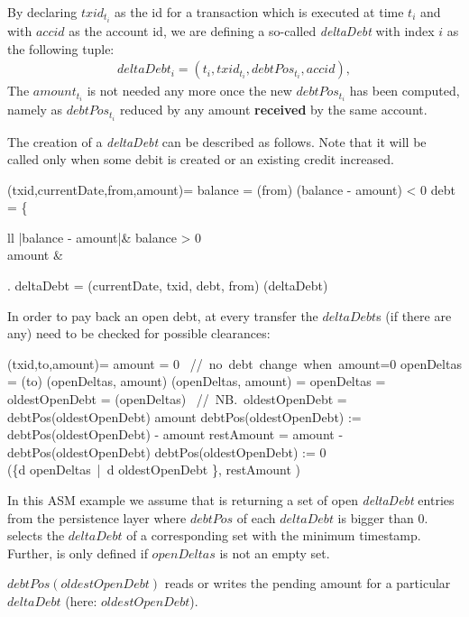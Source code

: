 By declaring $txid_{t_i}$ as the id for a transaction which is executed at time $t_i$ and with $accid$ as the account id, we are defining a so-called \textit{deltaDebt} with index $i$ as the following tuple:
\begin{align}
	deltaDebt_i = (t_i, txid_{t_i}, debtPos_{t_i}, accid),
\end{align}
The $amount_{t_i}$ is not needed any more once the new $debtPos_{t_i}$ has been computed, namely as $debtPos_{t_i}$ reduced by any amount \textbf{received} by the same account.

The creation of a \textit{deltaDebt} can be described as follows. Note that it will be called only when some debit is created or an existing credit increased.

\begin{asm}
	(txid,currentDate,from,amount)=\+
		\LET balance = (from)\+
			\IF (balance - amount) < 0 \THEN\+
				\LET debt =  \+\left\{\begin{array}{ll}
						|balance - amount|\+& \IF balance > 0\\
						amount & \ELSE
					\end{array}\right.\-\-
				\LET deltaDebt = (currentDate, txid, debt, from)\+
					(deltaDebt)
\end{asm}

In order to pay back an open debt, at every transfer the $deltaDebt$s (if there are any) need to be checked for possible clearances:

\begin{asm}
	(txid,to,amount)=\+
	\IF amount \not = 0 \THEN \mbox{  // no debt change when }amount=0\+	    
		\LET openDeltas = (to)\+
		   (openDeltas, amount) \dec\dec\-
	\WHERE \+
		(openDeltas, amount) =\+
			\IF openDeltas \not = \emptyset \THEN\+
				\LET oldestOpenDebt = (openDeltas) \mbox{  // NB. }oldestOpenDebt \not = \UNDEF\\
				\IF debtPos(oldestOpenDebt) \ge amount \THEN\+
					debtPos(oldestOpenDebt) := debtPos(oldestOpenDebt) - amount\-
				\ELSE \+
					\LET restAmount = amount - debtPos(oldestOpenDebt)\+
						debtPos(oldestOpenDebt) := 0\\
						(\{d \in openDeltas\ |\ d \neq oldestOpenDebt \}, restAmount )\dec\dec\dec\-
\end{asm}


In this ASM example we assume that  is returning a set of open \textit{deltaDebt} entries from the persistence layer where $debtPos$ of each $deltaDebt$ is bigger than $0$.  selects the $deltaDebt$ of a corresponding set with the minimum timestamp. Further,  is only defined if $openDeltas$ is not an empty set.

$debtPos(oldestOpenDebt)$ reads or writes the pending amount for a particular $deltaDebt$ (here: $oldestOpenDebt$).









